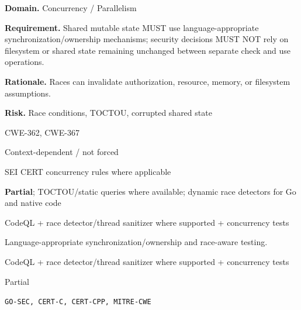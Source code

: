 \documentclass[10pt,letterpaper]{article}
\newcommand{\prioritybadge}[2]{\tcbox[on line,boxrule=0pt,arc=1.2mm,boxsep=0.7mm,left=1mm,right=1mm,top=0.4mm,bottom=0.4mm,colback=#2!12,coltext=#2]{\scriptsize\bfseries #1}}
\begin{document}
\begin{rulebox}[title={\texttt{SCS-ALL-CONC-001} \hfill \prioritybadge{High Priority}{High}}]
\textbf{Domain.} Concurrency / Parallelism

\textbf{Requirement.} Shared mutable state MUST use language-appropriate synchronization/ownership mechanisms; security decisions MUST NOT rely on filesystem or shared state remaining unchanged between separate check and use operations.

\textbf{Rationale.} Races can invalidate authorization, resource, memory, or filesystem assumptions.

\textbf{Risk.} Race conditions, TOCTOU, corrupted shared state

\begin{description}[leftmargin=2.65cm,labelwidth=2.3cm,style=nextline,itemsep=1pt,topsep=3pt]
  \item[CWE] CWE-362, CWE-367
  \item[OWASP] Context-dependent / not forced
  \item[CERT] SEI CERT concurrency rules where applicable
  \item[CodeQL] \textbf{Partial}; TOCTOU/static queries where available; dynamic race detectors for Go and native code
  \item[Enforcement] CodeQL + race detector/thread sanitizer where supported + concurrency tests
  \item[Prevention] Language-appropriate synchronization/ownership and race-aware testing.
  \item[Verification] CodeQL + race detector/thread sanitizer where supported + concurrency tests
  \item[Automation] Partial
  \item[Sources] \texttt{GO-SEC, CERT-C, CERT-CPP, MITRE-CWE}
\end{description}
\end{rulebox}
\end{document}
